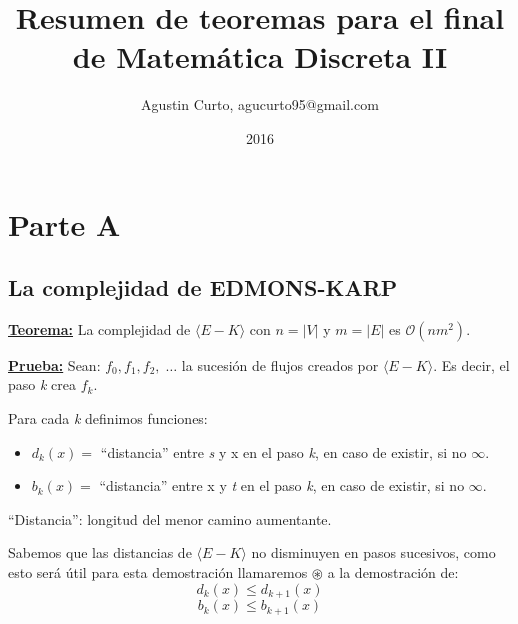 \documentclass[12pt,a4paper]{report}
\author{Agustin Curto, agucurto95@gmail.com}
\title{Resumen de teoremas para el final \\ de Matemática Discreta  II}
\date{2016}
\providecommand{\abs}[1]{\lvert#1\rvert}
\begin{document}
\maketitle
\tableofcontents


\chapter{Parte A}

	\section{La complejidad de EDMONS-KARP}
		\textbf{\underline{Teorema:}} La complejidad de $\langle E-K \rangle$ con $n = \abs{V}$ y $m = \abs{E}$ es $\mathcal{O}(nm^{2})$.

		\textbf{\underline{Prueba:}} Sean: $f_{0}, f_{1}, f_{2}, \; \dotsc$ \; la sucesión de flujos creados por $\langle E-K \rangle$. Es decir, el paso \textit{k} crea $f_{k}$.
			\vspace{5mm}
			\par Para cada \textit{k} definimos funciones:
			\begin{itemize}
				\item $d_{k}(x) =$ \textquotedblleft distancia\textquotedblright \; entre \textit{s} y x en el paso \textit{k}, en caso de existir, si no $\infty$.
				\item $b_{k}(x) =$ \textquotedblleft distancia\textquotedblright \; entre x y \textit{t} en el paso \textit{k}, en caso de existir, si no $\infty$.
			\end{itemize}

			\textquotedblleft Distancia\textquotedblright: longitud del menor camino aumentante.

			\vspace{5mm}
			\par Sabemos que las distancias de $\langle E-K \rangle$ no disminuyen en pasos sucesivos, como esto será útil para esta demostración llamaremos $\circledast$ a la demostración de:
				\[ d_{k}(x) \leq d_{k+1}(x) \]
				\[ b_{k}(x) \leq b_{k+1}(x) \]
\end{document}
